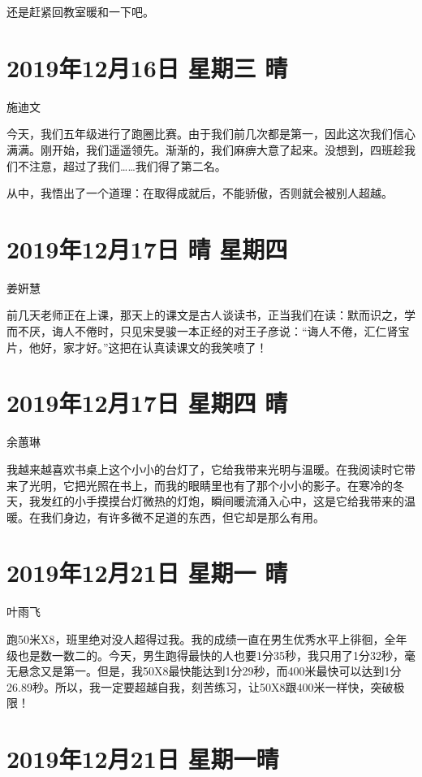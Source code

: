 还是赶紧回教室暖和一下吧。

\section{2019年12月16日 星期三 晴}

施迪文

今天，我们五年级进行了跑圈比赛。由于我们前几次都是第一，因此这次我们信心满满。刚开始，我们遥遥领先。渐渐的，我们麻痹大意了起来。没想到，四班趁我们不注意，超过了我们\ldots\ldots 我们得了第二名。

从中，我悟出了一个道理：在取得成就后，不能骄傲，否则就会被别人超越。

\section{2019年12月17日 晴 星期四}

姜姸慧

前几天老师正在上课，那天上的课文是古人谈读书，正当我们在读：默而识之，学而不厌，诲人不倦时，只见宋旻骏一本正经的对王子彦说：``诲人不倦，汇仁肾宝片，他好，家才好。''这把在认真读课文的我笑喷了！

\section{2019年12月17日 星期四 晴}

余蕙琳

我越来越喜欢书桌上这个小小的台灯了，它给我带来光明与温暖。在我阅读时它带来了光明，它把光照在书上，而我的眼睛里也有了那个小小的影子。在寒冷的冬天，我发红的小手摸摸台灯微热的灯炮，瞬间暖流涌入心中，这是它给我带来的温暖。在我们身边，有许多微不足道的东西，但它却是那么有用。

\section{2019年12月21日 星期一 晴}

叶雨飞

跑50米X8，班里绝对没人超得过我。我的成绩一直在男生优秀水平上徘徊，全年级也是数一数二的。今天，男生跑得最快的人也要1分35秒，我只用了1分32秒，毫无悬念又是第一。但是，我50X8最快能达到1分29秒，而400米最快可以达到1分26.89秒。所以，我一定要超越自我，刻苦练习，让50X8跟400米一样快，突破极限！

\section{2019年12月21日 星期一晴}

